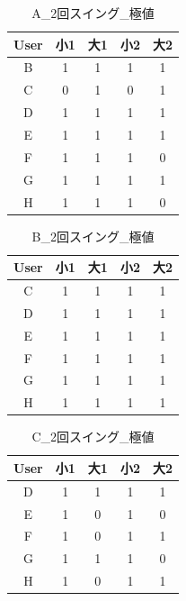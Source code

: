 \clearpage
\begin{table}[tb]
    \caption{A\_2回スイング\_極値}
    \vspace{0.5cm}
    \centering
    \begin{tabular}{|c|c|c|c|c|}
        \hline
        User & 小1 & 大1 & 小2 & 大2 \\\hline
        B & 1&1&1&1 \\
        C & 0&1&0&1 \\
        D & 1&1&1&1 \\
        E & 1&1&1&1 \\
        F & 1&1&1&0 \\
        G & 1&1&1&1 \\
        H & 1&1&1&0 \\
        \hline
    \end{tabular}
\end{table}
\begin{table}[tb]
    \caption{B\_2回スイング\_極値}
    \vspace{0.5cm}
    \centering
    \begin{tabular}{|c|c|c|c|c|}
        \hline
        User & 小1 & 大1 & 小2 & 大2 \\\hline
        C & 1&1&1&1 \\
        D & 1&1&1&1 \\
        E & 1&1&1&1 \\
        F & 1&1&1&1 \\
        G & 1&1&1&1 \\
        H & 1&1&1&1 \\
        \hline
    \end{tabular}
\end{table}
\begin{table}[tb]
    \caption{C\_2回スイング\_極値}
    \vspace{0.5cm}
    \centering
    \begin{tabular}{|c|c|c|c|c|}
        \hline
        User & 小1 & 大1 & 小2 & 大2 \\\hline
        D & 1&1&1&1 \\
        E & 1&0&1&0 \\
        F & 1&0&1&1 \\
        G & 1&1&1&0 \\
        H & 1&0&1&1 \\
        \hline
    \end{tabular}
\end{table}
